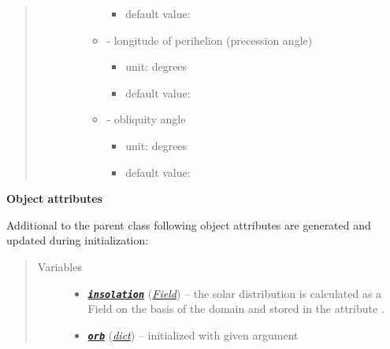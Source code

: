 \documentclass[letterpaper,10pt,english]{sphinxmanual}
\begin{document}
\begin{fulllineitems}
\begin{quote}
\begin{description}
\begin{itemize}
\begin{itemize}
\begin{itemize}
\item {} 
default value: 

\end{itemize}

\item {} 
 - longitude of perihelion (precession angle)
\begin{itemize}
\item {} 
unit: degrees

\item {} 
default value: 

\end{itemize}

\item {} 
 - obliquity angle
\begin{itemize}
\item {} 
unit: degrees

\item {} 
default value: 

\end{itemize}

\end{itemize}


\end{itemize}

\end{description}\end{quote}

\textbf{Object attributes}

Additional to the parent class {\hyperref[api/climlab.radiation:climlab.radiation.insolation._Insolation]{\emph{}}}
following object attributes are generated and updated during initialization:
\begin{quote}\begin{description}
\item[{Variables}] \leavevmode\begin{itemize}
\item {} 
{\hyperref[api/climlab.radiation:module-climlab.radiation.insolation]{\emph{\textbf{\texttt{insolation}}}}} ({\hyperref[api/climlab.domain:climlab.domain.field.Field]{\emph{\emph{Field}}}}) -- the solar distribution is calculated as a Field on 
the basis of the  domain
and stored in the attribute .

\item {} 
{\hyperref[api/climlab.radiation:climlab.radiation.insolation.AnnualMeanInsolation.orb]{\emph{\textbf{\texttt{orb}}}}} (\href{http://docs.python.org/2.7/library/stdtypes.html\#dict}{\emph{dict}}) -- initialized with given argument 


\end{itemize}
\end{description}
\end{quote}
\end{fulllineitems}
\end{document}
